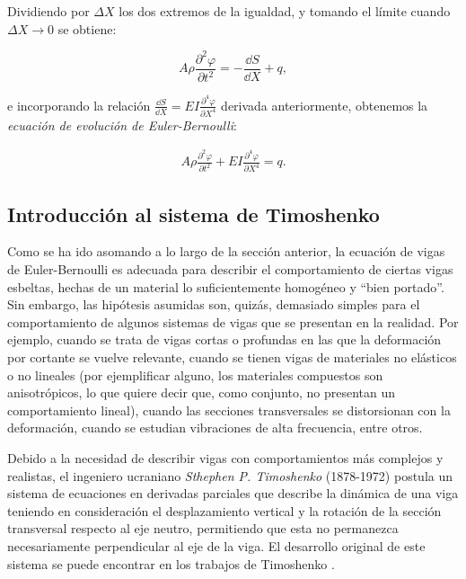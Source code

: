 Dividiendo por $\Delta X$ los dos extremos de la igualdad, y tomando el límite cuando $\Delta X \rightarrow 0$ se obtiene:

\[A \rho \frac{\partial^2 \varphi}{\partial t^2} = -\frac{\dd S}{\dd X} + q,\]

e incorporando la relación $\frac{\dd S}{\dd X} = EI \frac{\partial^4 \varphi}{\partial X^4}$ derivada anteriormente, obtenemos la \textit{ecuación de evolución de Euler-Bernoulli}:

\begin{align*}
    A \rho \frac{\partial^2 \varphi}{\partial t^2} + EI \frac{\partial^4 \varphi}{\partial X^4} = q.
\end{align*}

\subsection{Introducción al sistema de Timoshenko}
\label{ch:teoriaVigas:section:primerosmodelos:subsection:timoshenko}

Como se ha ido asomando a lo largo de la sección anterior, la ecuación de vigas de Euler-Bernoulli es adecuada para describir el comportamiento de ciertas vigas esbeltas, hechas de un material lo suficientemente homogéneo y ``bien portado''. Sin embargo, las hipótesis asumidas son, quizás, demasiado simples para el comportamiento de algunos sistemas de vigas que se presentan en la realidad. Por ejemplo, cuando se trata de vigas cortas o profundas en las que la deformación por cortante se vuelve relevante, cuando se tienen vigas de materiales no elásticos o no lineales (por ejemplificar alguno, los materiales compuestos son anisotrópicos, lo que quiere decir que, como conjunto, no presentan un comportamiento lineal), cuando las secciones transversales se distorsionan con la deformación, cuando se estudian vibraciones de alta frecuencia, entre otros. 

Debido a la necesidad de describir vigas con comportamientos más complejos y realistas, el ingeniero ucraniano \textit{Sthephen P. Timoshenko} (1878-1972) postula un sistema de ecuaciones en derivadas parciales que describe la dinámica de una viga teniendo en consideración el desplazamiento vertical y la rotación de la sección transversal respecto al eje neutro, permitiendo que esta no permanezca necesariamente perpendicular al eje de la viga. El desarrollo original de este sistema se puede encontrar en los trabajos de Timoshenko \cite{timoshenko-1921-lxv-ion-cor,timoshenko-1922-x-ion-tra}.

